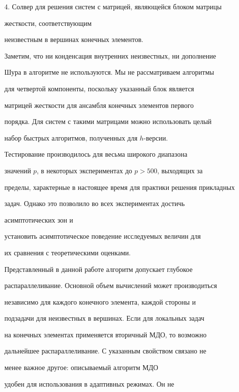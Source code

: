 4. Солвер для решения систем с матрицей, являющейся блоком матрицы 


жесткости, соответствующим


неизвестным в вершинах конечных элементов.





Заметим, что ни конденсация внутренних неизвестных, ни дополнение


Шура в алгоритме не используются. Мы не рассматриваем алгоритмы


для четвертой компоненты, поскольку указанный блок является


матрицей жесткости для ансамбля конечных элементов первого


порядка. Для систем с такими матрицами можно использовать целый


набор быстрых алгоритмов, полученных для $h$-версии.





Тестирование производилось для весьма широкого диапазона


значений $p$, в некоторых экспериментах до $p>500$, выходящих за


пределы, характерные в настоящее время для практики решения прикладных 


задач. Однако это позволило во всех экспериментах достичь 


асимптотических зон и


установить асимптотическое поведение исследуемых величин для


их сравнения с теоретическими оценками.








Представленный в данной работе алгоритм допускает глубокое


распараллеливание. Основной объем вычислений может производиться


независимо для каждого конечного элемента, каждой стороны и


подзадачи для неизвестных в вершинах. Если для локальных задач


на конечных элементах применяется вторичный МДО, то возможно


дальнейшее распараллеливание. С указанным свойством связано не


менее важное другое: описываемый алгоритм МДО


удобен для использования в адаптивных режимах. Он не


